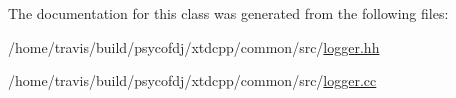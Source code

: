 The documentation for this class was generated from the following files\-:\begin{DoxyCompactItemize}
\item 
/home/travis/build/psycofdj/xtdcpp/common/src/\hyperlink{logger_8hh}{logger.\-hh}\item 
/home/travis/build/psycofdj/xtdcpp/common/src/\hyperlink{logger_8cc}{logger.\-cc}\end{DoxyCompactItemize}
